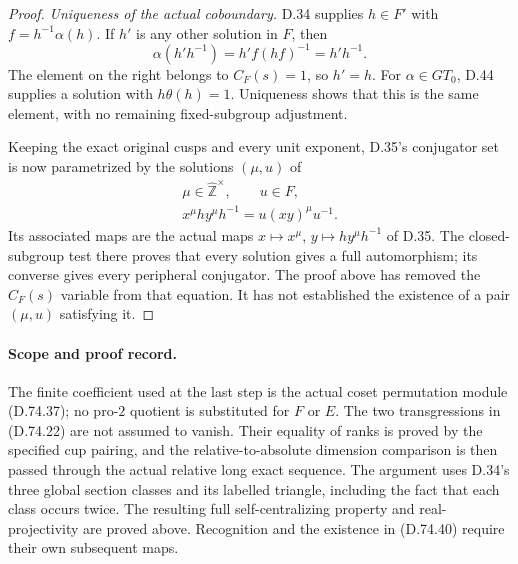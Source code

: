 \begin{proof}
\emph{Uniqueness of the actual coboundary.}
D.34 supplies $h\in F'$ with
$f=h^{-1}\alpha(h)$.  If $h'$ is any other
solution in $F$, then
\[
 \alpha(h'h^{-1})=h'f(hf)^{-1}=h'h^{-1}.
 \tag{D.74.39}
\]
The element on the right belongs to $C_F(s)=1$,
so $h'=h$.  For $\alpha\in GT_0$, D.44 supplies
a solution with $h\theta(h)=1$.  Uniqueness shows
that this is the same element, with no remaining
fixed-subgroup adjustment.

Keeping the exact original cusps and every unit
exponent, D.35's conjugator set is now parametrized
by the solutions $(\mu,u)$ of
\[
 \begin{gathered}
 \mu\in\widehat{\mathbb Z}^{\times},\qquad u\in F,\\
             x^\mu h y^\mu h^{-1}
                         =u(xy)^\mu u^{-1}.
 \end{gathered}
 \tag{D.74.40}
\]
Its associated maps are the actual maps
$x\mapsto x^\mu$, $y\mapsto hy^\mu h^{-1}$
of D.35.  The closed-subgroup test there proves
that every solution gives a full automorphism;
its converse gives every peripheral conjugator.
The proof above has removed the $C_F(s)$ variable
from that equation.  It has not established the
existence of a pair $(\mu,u)$ satisfying it.
\end{proof}

\paragraph{Scope and proof record.}
The finite coefficient used at the last step is the
actual coset permutation module (D.74.37); no
pro-$2$ quotient is substituted for $F$ or $E$.
The two transgressions in (D.74.22) are not assumed to
vanish.  Their equality of ranks is proved by the
specified cup pairing, and the relative-to-absolute
dimension comparison is then passed through the
actual relative long exact sequence.  The argument
uses D.34's three global section classes and its
labelled triangle, including the fact that each
class occurs twice.  The resulting full self-centralizing property and
real-projectivity are proved above.  Recognition and
the existence in (D.74.40) require their own subsequent maps.
